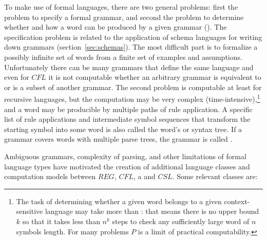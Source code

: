 To make use of formal languages, there are two general problems: first the
problem to specify a formal grammar, and second the problem to determine
whether and how a word can be produced by a given grammar (). The
specification problem is related to the application of schema languages for
writing down grammars (section~\ref{sec:schemas}). The most difficult part is
to formalize a possibly infinite set of words from a finite set of examples and
assumptions.  Unfortunately there can be many grammars that define the same
language and even for $CFL$ it is not computable whether an arbitrary grammar
is equivalent to or is a subset of another grammar. The second problem is
computable at least for recursive languages, but the computation may be very
complex (time-intensive),\footnote{The task of determining whether a given word
belongs to a given context-sensitive language may take more than
: that means there is no upper bound $k$ so that it
takes less than $n^k$ steps to check any sufficiently large word of $n$ symbols
length. For many problems $P$ is a limit of practical computability.} and a
word may be producible by multiple paths of rule application. A specific list
of rule applications and intermediate symbol sequences that transform the
starting symbol into some word is also called the word's  or
syntax tree. If a grammar covers words with
multiple parse trees, the grammar is called . 

Ambiguous grammars, complexity of parsing, and other limitations of
formal language types have motivated the creation of additional language 
classes and computation models between $REG$, $CFL$, a and $CSL$. 
Some relevant classes are:

